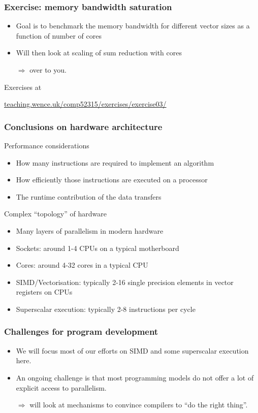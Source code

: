 \documentclass[presentation,aspectratio=43,10pt]{beamer}
\begin{document}
\begin{frame}
  \frametitle{Exercise: memory bandwidth saturation}
  \begin{itemize}
  \item Goal is to benchmark the memory bandwidth for different vector
    sizes as a function of number of cores
  \item Will then look at scaling of sum reduction with cores
  \item[$\Rightarrow$] over to you.
  \end{itemize}
  \begin{center}
    Exercises at

    \url{teaching.wence.uk/comp52315/exercises/exercise03/}
  \end{center}
\end{frame}

\begin{frame}
  \frametitle{Conclusions on hardware architecture}
  \begin{challenge}{Performance considerations}
    \begin{itemize}
    \item How many instructions are required to implement an algorithm
    \item How efficiently those instructions are executed on a
      processor
    \item The runtime contribution of the data transfers
    \end{itemize}
  \end{challenge}
  \begin{answer}{Complex ``topology'' of hardware}
    \begin{itemize}
    \item Many layers of parallelism in modern hardware
    \item Sockets: around 1-4 CPUs on a typical motherboard
    \item Cores: around 4-32 cores in a typical CPU
    \item SIMD/Vectorisation: typically 2-16 single precision elements
      in vector registers on CPUs
    \item Superscalar execution: typically 2-8 instructions per cycle
    \end{itemize}
  \end{answer}
\end{frame}
\begin{frame}
  \frametitle{Challenges for program development}
  \begin{itemize}
  \item We will focus most of our efforts on SIMD and some superscalar
    execution here.
  \item An ongoing challenge is that most programming models do not
    offer a lot of explicit access to parallelism.
  \item[$\Rightarrow$] will look at mechanisms to convince compilers
    to ``do the right thing''.
  \end{itemize}
\end{frame}
\end{document}
